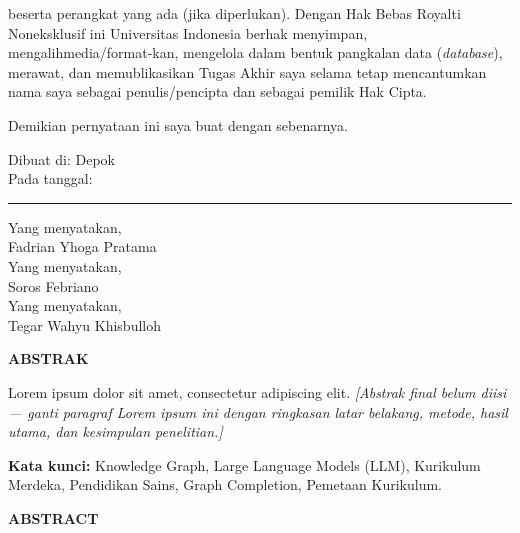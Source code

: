 \documentclass[main]{subfiles}
\begin{document}
\noindent beserta perangkat yang ada (jika diperlukan). Dengan Hak Bebas Royalti
Noneksklusif ini Universitas Indonesia berhak menyimpan,
mengalihmedia/format-kan, mengelola dalam bentuk pangkalan data
(\textit{database}), merawat, dan memublikasikan Tugas Akhir saya selama tetap
mencantumkan nama saya sebagai penulis/pencipta dan sebagai pemilik Hak Cipta.
\vspace{0.6cm}

\noindent Demikian pernyataan ini saya buat dengan sebenarnya.
\vspace{0.6cm}

\noindent Dibuat di: Depok\\
Pada tanggal: \rule{3cm}{0.4pt}
\vspace{1cm}

\begin{flushright}
Yang menyatakan,\\[1.2cm]
Fadrian Yhoga Pratama\\[0.8cm]
Yang menyatakan,\\[1.2cm]
Soros Febriano\\[0.8cm]
Yang menyatakan,\\[1.2cm]
Tegar Wahyu Khisbulloh
\end{flushright}

\clearpage
{}
\begin{center}\bfseries ABSTRAK\end{center}
\vspace{0.6cm}
\onehalfspacing
{}
\vspace{0.6cm}

\noindent Lorem ipsum dolor sit amet, consectetur adipiscing elit. \emph{[Abstrak
final belum diisi --- ganti paragraf Lorem ipsum ini dengan ringkasan latar
belakang, metode, hasil utama, dan kesimpulan penelitian.]}
\vspace{0.6cm}

\noindent\textbf{Kata kunci:} Knowledge Graph, Large Language Models (LLM),
Kurikulum Merdeka, Pendidikan Sains, Graph Completion, Pemetaan Kurikulum.

\clearpage
{}
\begin{center}\bfseries ABSTRACT\end{center}
\vspace{0.6cm}
\onehalfspacing
{}
\vspace{0.6cm}
\end{document}
